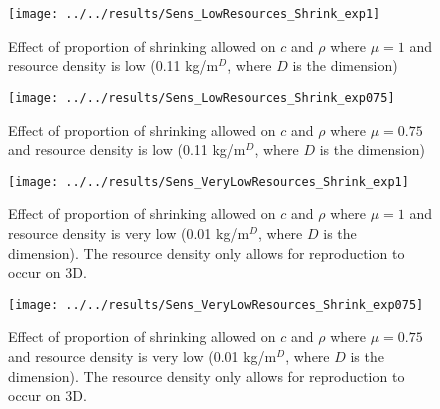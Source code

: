 \begin{refsection}
\begin{figure}[h]
	\centering
	\texttt{[image: ../../results/Sens\_LowResources\_Shrink\_exp1]}
	\caption{Effect of proportion of shrinking allowed on $c$ and $\rho$ where $\mu = 1$ and resource density is low (0.11 kg/m$^D$, where $D$ is the dimension)}
	\label{fig:senslowresourcesshrinkexp1}
\end{figure}
\begin{figure}[h]
	\centering
	\texttt{[image: ../../results/Sens\_LowResources\_Shrink\_exp075]}
	\caption{Effect of proportion of shrinking allowed on $c$ and $\rho$ where $\mu = 0.75$ and resource density is low (0.11 kg/m$^D$, where $D$ is the dimension)}
	\label{fig:senslowresourcesshrinkexp075}
\end{figure}
\begin{figure}[h]
	\centering
	\texttt{[image: ../../results/Sens\_VeryLowResources\_Shrink\_exp1]}
	\caption{Effect of proportion of shrinking allowed on $c$ and $\rho$ where $\mu = 1$ and resource density is very low (0.01 kg/m$^D$, where $D$ is the dimension).  The resource density only allows for reproduction to occur on 3D.}
	\label{fig:sensverylowresourcesshrinkexp1}
\end{figure}
\begin{figure}[h]
	\centering
	\texttt{[image: ../../results/Sens\_VeryLowResources\_Shrink\_exp075]}
	\caption{Effect of proportion of shrinking allowed on $c$ and $\rho$ where $\mu = 0.75$ and resource density is very low (0.01 kg/m$^D$, where $D$ is the dimension).  The resource density only allows for reproduction to occur on 3D.}
	\label{fig:sensverylowresourcesshrinkexp075}
\end{figure}

\clearpage
	\printbibliography
\end{refsection}
